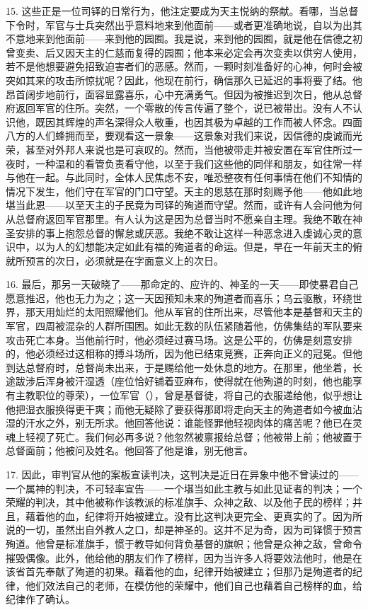 15. 这些正是一位司铎的日常行为，他注定要成为天主悦纳的祭献。看哪，当总督下令时，军官与士兵突然出乎意料地来到他面前——或者更准确地说，自以为出其不意地来到他面前——来到他的园囿。我是说，来到他的园囿，就是他在信德之初曾变卖、后又因天主的仁慈而复得的园囿；他本来必定会再次变卖以供穷人使用，若不是他想要避免招致迫害者们的恶感。然而，一颗时刻准备好的心神，何时会被突如其来的攻击所惊扰呢？因此，他现在前行，确信那久已延迟的事将要了结。他昂首阔步地前行，面容显露喜乐，心中充满勇气。但因为被推迟到次日，他从总督府返回军官的住所。突然，一个零散的传言传遍了整个，说已被带出。没有人不认识他，既因其辉煌的声名深得众人敬重，也因其极为卓越的工作而被人怀念。四面八方的人们蜂拥而至，要观看这一景象——这景象对我们来说，因信德的虔诚而光荣，甚至对外邦人来说也是可哀叹的。然而，当他被带走并被安置在军官住所过一夜时，一种温和的看管负责看守他，以至于我们这些他的同伴和朋友，如往常一样与他在一起。与此同时，全体人民焦虑不安，唯恐整夜有任何事情在他们不知情的情况下发生，他们守在军官的门口守望。天主的恩慈在那时刻赐予他——他如此地堪当此恩——以至天主的子民竟为司铎的殉道而守望。然而，或许有人会问他为何从总督府返回军官那里。有人认为这是因为总督当时不愿亲自主理。我绝不敢在神圣安排的事上抱怨总督的懈怠或厌恶。我绝不敢让这样一种恶念进入虔诚心灵的意识中，以为人的幻想能决定如此有福的殉道者的命运。但是，早在一年前天主的俯就所预言的次日，必须就是在字面意义上的次日。\par

16. 最后，那另一天破晓了——那命定的、应许的、神圣的一天——即使暴君自己愿意推迟，他也无力为之；这一天因预知未来的殉道者而喜乐；乌云驱散，环绕世界，那天用灿烂的太阳照耀他们。他从军官的住所出来，尽管他本是基督和天主的军官，四周被混杂的人群所围困。如此无数的队伍紧随着他，仿佛集结的军队要来攻击死亡本身。当他前行时，他必须经过赛马场。这是公平的，仿佛是刻意安排的，他必须经过这相称的搏斗场所，因为他已结束竞赛，正奔向正义的冠冕。但他到达总督府时，总督尚未出来，于是赐给他一处休息的地方。在那里，他坐着，长途跋涉后浑身被汗湿透（座位恰好铺着亚麻布，使得就在他殉道的时刻，他也能享有主教职位的尊荣），一位军官（），曾是基督徒，将自己的衣服递给他，似乎想让他把湿衣服换得更干爽；而他无疑除了要获得那即将走向天主的殉道者如今被血沾湿的汗水之外，别无所求。他回答他说：谁能怪罪他轻视肉体的痛苦呢？他已在灵魂上轻视了死亡。我们何必再多说？他忽然被禀报给总督；他被带上前；他被置于总督面前；他被问及姓名。他回答了他是谁，别无他言。\par

17. 因此，审判官从他的案板宣读判决，这判决是近日在异象中他不曾读过的——一个属神的判决，不可轻率宣告——一个堪当如此主教与如此见证者的判决；一个荣耀的判决，其中他被称作该教派的标准旗手、众神之敌、以及他子民的榜样；并且，藉着他的血，纪律将开始被建立。没有比这判决更完全、更真实的了。因为所说的一切，虽然出自外教人之口，却是神圣的。这并不足为奇，因为司铎惯于预言殉道。他曾是标准旗手，惯于教导如何背负基督的旗帜；他曾是众神之敌，曾命令摧毁偶像。此外，他给他的朋友们作了榜样，因为当许多人将要效法他时，他是在该省首先奉献了殉道的初果。藉着他的血，纪律开始被建立；但那乃是殉道者的纪律，他们效法自己的老师，在模仿他的荣耀中，他们自己也藉着自己榜样的血，给纪律作了确认。\par

